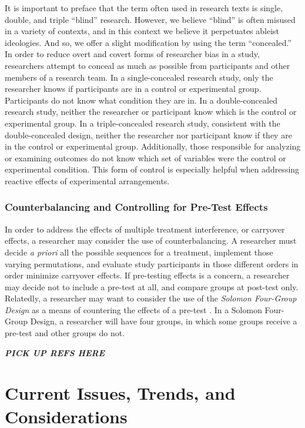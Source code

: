 \documentclass[
  11pt,
]{book}
\begin{document}
It is important to preface that the term often used in research texts is single, double, and triple ``blind'' research. However, we believe ``blind'' is often misused in a variety of contexts, and in this context we believe it perpetuates ableist ideologies. And so, we offer a slight modification by using the term ``concealed.'' In order to reduce overt and covert forms of researcher bias in a study, researchers attempt to conceal as much as possible from participants and other members of a research team. In a single-concealed research study, only the researcher knows if participants are in a control or experimental group. Participants do not know what condition they are in. In a double-concealed research study, neither the researcher or participant know which is the control or experimental group. In a triple-concealed research study, consistent with the double-concealed design, neither the researcher nor participant know if they are in the control or experimental group. Additionally, those responsible for analyzing or examining outcomes do not know which set of variables were the control or experimental condition. This form of control is especially helpful when addressing reactive effects of experimental arrangements.

\subsubsection{Counterbalancing and Controlling for Pre-Test Effects}\label{counterbalancing-and-controlling-for-pre-test-effects}

In order to address the effects of multiple treatment interference, or carryover effects, a researcher may consider the use of counterbalancing. A researcher must decide \emph{a priori} all the possible sequences for a treatment, implement those varying permutations, and evaluate study participants in those different orders in order minimize carryover effects. If pre-testing effects is a concern, a researcher may decide not to include a pre-test at all, and compare groups at post-test only. Relatedly, a researcher may want to consider the use of the \emph{Solomon Four-Group Design} as a means of countering the effects of a pre-test \citep{allen_sage_2017}. In a Solomon Four-Group Design, a researcher will have four groups, in which some groups receive a pre-test and other groups do not.

\textbf{\emph{PICK UP REFS HERE}}

\section{Current Issues, Trends, and Considerations}\label{current-issues-trends-and-considerations}
\end{document}

